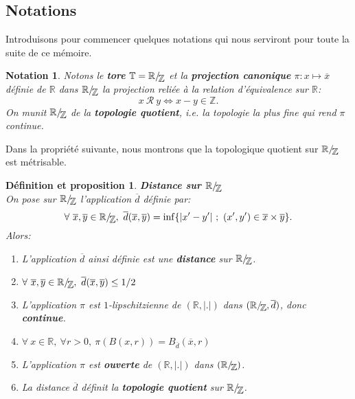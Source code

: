 \documentclass[11pt,a4 paper]{article}
\newtheorem{definitionproposition}[theoreme]{Définition et proposition}
\newtheorem{nota}[theoreme]{Notation}
\newcommand{\Tbb}{\mathbb{T}}
\newcommand{\Rbb}{\mathbb{R}}
\newcommand{\Zbb}{\mathbb{Z}}
\newcommand*{\EnsembleQuotient}[2]%
{\ensuremath{%
		#1/\!\raisebox{-.65ex}{\ensuremath{\mathcal{#2}}}}}
\newenvironment{defippt}{\begin{box_defippt}\begin{definitionproposition}}{\end{definitionproposition}\end{box_defippt}}
\begin{document}
\subsection{Notations}
Introduisons pour commencer quelques notations qui nous serviront pour toute la suite de ce mémoire.

\begin{nota}
	Notons le \textbf{tore} $\Tbb=\EnsembleQuotient{\Rbb}{\mathbb{Z}}$ et la \textbf{projection canonique} $\pi: x \mapsto \overline{x}$ définie de $\mathbb{R}$ dans $\EnsembleQuotient{\Rbb}{\mathbb{Z}}$ la projection reliée à la relation d'équivalence sur $\mathbb{R}$:
	$$x \ \mathcal{R} \ y \Longleftrightarrow x - y \in \mathbb{Z}.$$
	On munit $\EnsembleQuotient{\Rbb}{\mathbb{Z}}$ de la \textbf{topologie quotient}, i.e. la topologie la plus fine qui rend $\pi$ continue.
\end{nota}


Dans la propriété suivante, nous montrons que la topologique quotient sur $\EnsembleQuotient{\Rbb}{\mathbb{Z}}$ est métrisable.


\begin{defippt}\label{distance sur R/Z}\textbf{Distance sur $\EnsembleQuotient{\Rbb}{\Zbb}$}\\
	On pose sur $\EnsembleQuotient{\Rbb}{\Zbb}$ l'application $\overline{d}$ définie par:
	$$\forall\ \overline{x}, \overline{y} \in \EnsembleQuotient{\Rbb}{\Zbb},\ \overline{d}(\overline{x},\overline{y})=\inf \lbrace |x'-y'|\ ;\ (x',y')\in \overline{x}\times\overline{y}\rbrace.$$ 
	Alors:
	\begin{enumerate}
		\item L'application $\overline{d}$ ainsi définie est une \textbf{distance} sur $\EnsembleQuotient{\Rbb}{\Zbb}$.
		\item $\forall\ \overline{x}, \overline{y} \in \EnsembleQuotient{\Rbb}{\Zbb},\ \overline{d}(\overline{x},\overline{y})\leq 1/2$
		\item L'application $\pi$ est $1$-lipschitzienne de $(\Rbb, |.|)$ dans $(\EnsembleQuotient{\Rbb}{\Zbb}, \overline{d})$, donc \textbf{continue}.
		\item $\forall\ x \in \Rbb,\ \forall r>0,\ \pi(B(x,r))=B_{\overline{d}}(\overline{x},r)$
		\item L'application $\pi$ est \textbf{ouverte} de $(\Rbb,|.|)$ dans $(\EnsembleQuotient{\Rbb}{\Zbb})$.
		\item La distance $\overline{d}$ définit la \textbf{topologie quotient} sur $\EnsembleQuotient{\Rbb}{\Zbb}$.
	\end{enumerate}
	

\end{defippt}	
\end{document}
